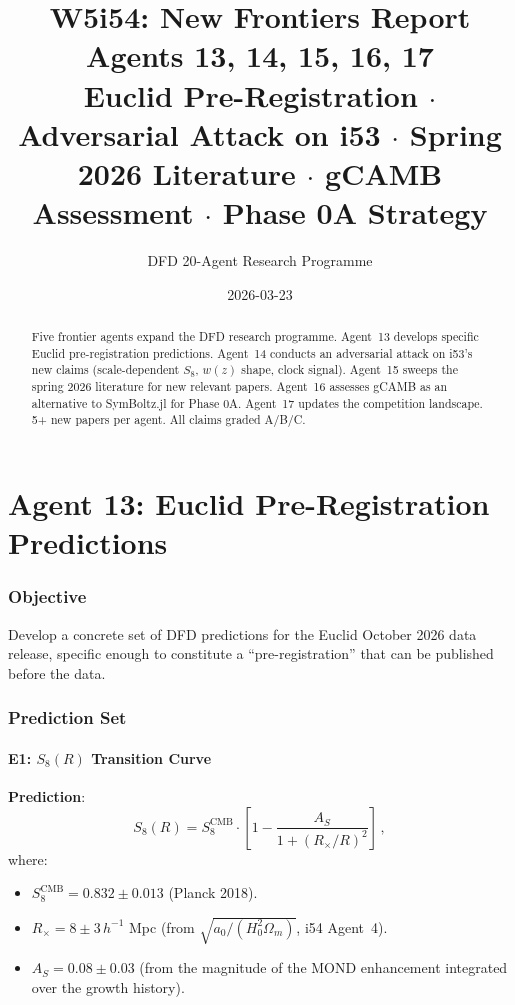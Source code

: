 \documentclass[11pt,a4paper]{article}
\title{\Huge W5i54: New Frontiers Report\\[12pt]
\Large Agents 13, 14, 15, 16, 17\\[6pt]
\large Euclid Pre-Registration $\cdot$ Adversarial Attack on i53 $\cdot$ Spring 2026 Literature $\cdot$ gCAMB Assessment $\cdot$ Phase 0A Strategy}
\author{DFD 20-Agent Research Programme}
\date{2026-03-23}
\begin{document}
\maketitle

\begin{abstract}
Five frontier agents expand the DFD research programme. Agent~13 develops specific Euclid pre-registration predictions. Agent~14 conducts an adversarial attack on i53's new claims (scale-dependent $S_8$, $w(z)$ shape, clock signal). Agent~15 sweeps the spring 2026 literature for new relevant papers. Agent~16 assesses gCAMB as an alternative to SymBoltz.jl for Phase 0A. Agent~17 updates the competition landscape. 5+ new papers per agent. All claims graded A/B/C.
\end{abstract}

\tableofcontents
\newpage


\part{Agent 13: Euclid Pre-Registration Predictions}
\label{part:euclid-prereg}

\section{Objective}

Develop a concrete set of DFD predictions for the Euclid October 2026 data release, specific enough to constitute a ``pre-registration'' that can be published before the data.

\section{Prediction Set}

\subsection{E1: $S_8(R)$ Transition Curve}

\textbf{Prediction}:
\begin{equation}
S_8(R) = S_8^{\mathrm{CMB}} \cdot \left[1 - \frac{A_S}{1 + (R_\times/R)^2}\right]\,,
\end{equation}
where:
\begin{itemize}
\item $S_8^{\mathrm{CMB}} = 0.832 \pm 0.013$ (Planck 2018).
\item $R_\times = 8 \pm 3\,h^{-1}$ Mpc (from $\sqrt{a_0/(H_0^2\Omega_m)}$, i54 Agent~4).
\item $A_S = 0.08 \pm 0.03$ (from the magnitude of the MOND enhancement integrated over the growth history).
\end{itemize}
\end{document}
